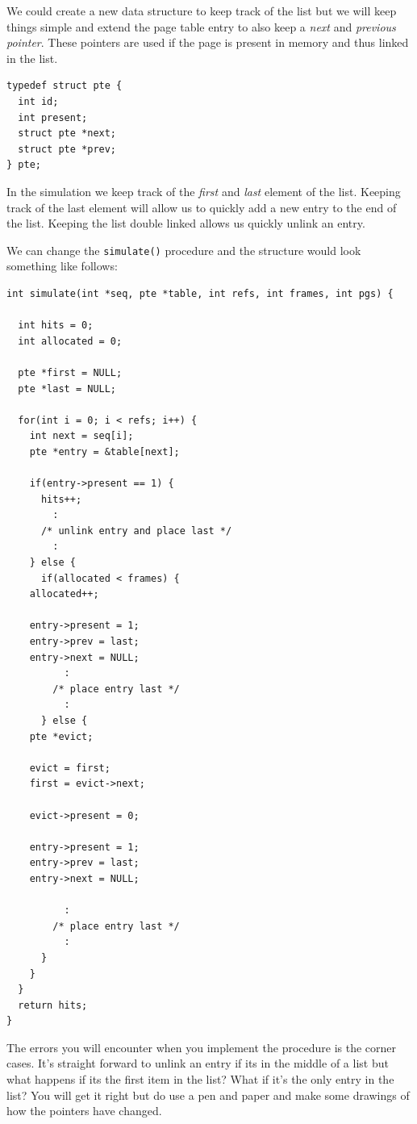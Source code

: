 \documentclass[a4paper,11pt]{article}
\begin{document}
We could create a new data structure to keep track of the list but we
will keep things simple and extend the page table entry to also keep a
{\em next} and {\em previous pointer}. These pointers are used if the
page is present in memory and thus linked in the list.

\begin{lstlisting}
typedef struct pte {
  int id;
  int present;
  struct pte *next;
  struct pte *prev;  
} pte;
\end{lstlisting}

In the simulation we keep track of the {\em first} and {\em last}
element of the list. Keeping track of the last element will allow us
to quickly add a new entry to the end of the list. Keeping the list
double linked allows us quickly unlink an entry.


We can change the {\tt simulate()} procedure and the structure would look something like follows:


\begin{lstlisting}
int simulate(int *seq, pte *table, int refs, int frames, int pgs) {

  int hits = 0;
  int allocated = 0;

  pte *first = NULL;
  pte *last = NULL;  
  
  for(int i = 0; i < refs; i++) {
    int next = seq[i];
    pte *entry = &table[next];

    if(entry->present == 1) {
      hits++;
        :
      /* unlink entry and place last */
        :
    } else {
      if(allocated < frames) {
	allocated++;

	entry->present = 1;
	entry->prev = last;
	entry->next = NULL;
          :
        /* place entry last */
          :
      } else {
	pte *evict;

	evict = first;
	first = evict->next;

	evict->present = 0;

	entry->present = 1;
	entry->prev = last;
	entry->next = NULL;

          :
        /* place entry last */
          :
      }
    }
  }
  return hits;
}
\end{lstlisting}

The errors you will encounter when you implement the procedure is the
corner cases. It's straight forward to unlink an entry if its in the
middle of a list but what happens if its the first item in the list?
What if it's the only entry in the list? You will get it right but do
use a pen and paper and make some drawings of how the pointers have
changed.
\end{document}
